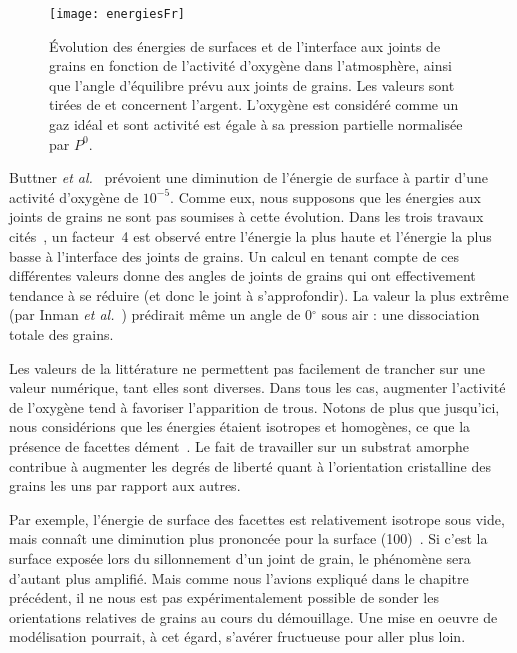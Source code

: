 \begin{figure}[!htb]
\centering
\texttt{[image: energiesFr]}
\caption{Évolution des énergies de surfaces et de l’interface aux joints de grains en fonction de l’activité d’oxygène dans l’atmosphère, ainsi que l’angle d’équilibre prévu aux joints de grains. Les valeurs sont tirées de \cite{buttner1952adsorption, inman1963interfacial, fiala1975surface, kudrman1969relative} et concernent l’argent. L'oxygène est considéré comme un gaz idéal et sont activité est égale à sa pression partielle normalisée par $P^0$.}
\label{energiesFr}
\end{figure}
Buttner \textit{et al.}~\cite{buttner1952adsorption} prévoient une diminution de l’énergie de surface à partir d’une activité d’oxygène de $10^{-5}$. Comme eux, nous supposons que les énergies aux joints de grains ne sont pas soumises à cette évolution. Dans les trois travaux cités~\cite{inman1963interfacial, fiala1975surface, kudrman1969relative}, un facteur~4 est observé entre l’énergie la plus haute et l’énergie la plus basse à l'interface des joints de grains. Un calcul en tenant compte de ces différentes valeurs donne des angles de joints de grains qui ont effectivement tendance à se réduire (et donc le joint à s’approfondir). La valeur la plus extrême (par Inman \textit{et al.}~\cite{inman1963interfacial}) prédirait même un angle de 0$^\circ$ sous air : une dissociation totale des grains.\par 
Les valeurs de la littérature ne permettent pas facilement de trancher sur une valeur numérique, tant elles sont diverses. Dans tous les cas, augmenter l’activité de l’oxygène tend à favoriser l’apparition de trous. Notons de plus que jusqu’ici, nous considérions que les énergies étaient isotropes et homogènes, ce que la présence de facettes dément~\cite{wulff1901xxv}. Le fait de travailler sur un substrat amorphe contribue à augmenter les degrés de liberté quant à l’orientation cristalline des grains les uns par rapport aux autres.\par 
Par exemple, l’énergie de surface des facettes est relativement isotrope sous vide, mais connaît une diminution plus prononcée pour la surface (100)~\cite{molina2011size}. Si c’est la surface exposée lors du sillonnement d’un joint de grain, le phénomène sera d’autant plus amplifié. Mais comme nous l’avions expliqué dans le chapitre précédent, il ne nous est pas expérimentalement possible de sonder les orientations relatives de grains au cours du démouillage. Une mise en oeuvre de modélisation pourrait, à cet égard, s’avérer fructueuse pour aller plus loin.\par 
